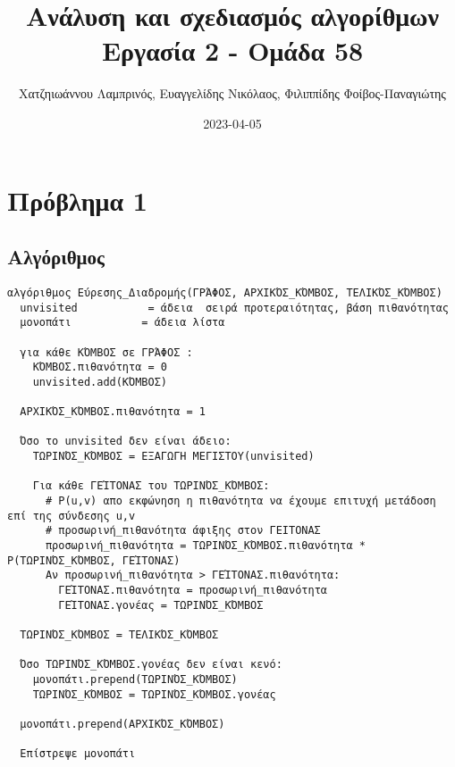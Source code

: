 \documentclass[11pt]{article}
\author{Χατζηιωάννου Λαμπρινός, Ευαγγελίδης Νικόλαος, Φιλιππίδης Φοίβος-Παναγιώτης}
\date{2023-04-05}
\title{Ανάλυση και σχεδιασμός αλγορίθμων\\\medskip
\large Εργασία 2 - Ομάδα 58}
\begin{document}
\maketitle
\section{Πρόβλημα 1}
\label{sec:org5d52a99}
\subsection{Αλγόριθμος}
\label{sec:org131af09}
\begin{verbatim}
αλγόριθμος Εύρεσης_Διαδρομής(ΓΡΆΦΟΣ, ΑΡΧΙΚΌΣ_ΚΌΜΒΟΣ, ΤΕΛΙΚΌΣ_ΚΌΜΒΟΣ)
  unvisited           = άδεια  σειρά προτεραιότητας, βάση πιθανότητας
  μονοπάτι           = άδεια λίστα 

  για κάθε ΚΌΜΒΟΣ σε ΓΡΆΦΟΣ :
    ΚΌΜΒΟΣ.πιθανότητα = 0
    unvisited.add(ΚΌΜΒΟΣ)
  
  ΑΡΧΙΚΌΣ_ΚΌΜΒΟΣ.πιθανότητα = 1

  Όσο το unvisited δεν είναι άδειο:
    ΤΩΡΙΝΌΣ_ΚΌΜΒΟΣ = ΕΞΑΓΩΓΗ ΜΕΓΙΣΤΟΥ(unvisited)
    
    Για κάθε ΓΕΊΤΟΝΑΣ του ΤΩΡΙΝΌΣ_ΚΌΜΒΟΣ:
      # P(u,v) απο εκφώνηση η πιθανότητα να έχουμε επιτυχή μετάδοση επί της σύνδεσης u,v
      # προσωρινή_πιθανότητα άφιξης στον ΓΕΙΤΟΝΑΣ
      προσωρινή_πιθανότητα = ΤΩΡΙΝΌΣ_ΚΌΜΒΟΣ.πιθανότητα * P(ΤΩΡΙΝΌΣ_ΚΌΜΒΟΣ, ΓΕΊΤΟΝΑΣ)
      Αν προσωρινή_πιθανότητα > ΓΕΊΤΟΝΑΣ.πιθανότητα:
        ΓΕΊΤΟΝΑΣ.πιθανότητα = προσωρινή_πιθανότητα
        ΓΕΊΤΟΝΑΣ.γονέας = ΤΩΡΙΝΌΣ_ΚΌΜΒΟΣ
 
  ΤΩΡΙΝΌΣ_ΚΌΜΒΟΣ = ΤΕΛΙΚΌΣ_ΚΌΜΒΟΣ
  
  Όσο ΤΩΡΙΝΌΣ_ΚΌΜΒΟΣ.γονέας δεν είναι κενό:
    μονοπάτι.prepend(ΤΩΡΙΝΌΣ_ΚΌΜΒΟΣ)
    ΤΩΡΙΝΌΣ_ΚΌΜΒΟΣ = ΤΩΡΙΝΌΣ_ΚΌΜΒΟΣ.γονέας 
  
  μονοπάτι.prepend(ΑΡΧΙΚΌΣ_ΚΌΜΒΟΣ)
  
  Επίστρεψε μονοπάτι
\end{verbatim}
\end{document}
